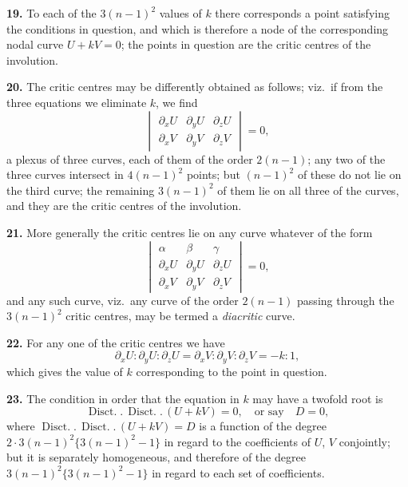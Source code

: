 \documentclass[11pt,a4paper]{article}
\providecommand{\Disct}{\operatorname{Disct.}}
\begin{document}
\medskip

\textbf{19.} To each of the $3(n-1)^2$ values of $k$ there corresponds a point satisfying the conditions in question, and which is therefore a node of the corresponding nodal curve $U + kV = 0$; the points in question are the critic centres of the involution.

\medskip

\textbf{20.} The critic centres may be differently obtained as follows; viz.\ if from the three equations we eliminate $k$, we find
\[
\begin{vmatrix} \partial_x U & \partial_y U & \partial_z U \\ \partial_x V & \partial_y V & \partial_z V \end{vmatrix} = 0,
\]
a plexus of three curves, each of them of the order $2(n - 1)$; any two of the three curves intersect in $4(n-1)^2$ points; but $(n-1)^2$ of these do not lie on the third curve; the remaining $3(n-1)^2$ of them lie on all three of the curves, and they are the critic centres of the involution.

\medskip

\textbf{21.} More generally the critic centres lie on any curve whatever of the form
\[
\begin{vmatrix} \alpha & \beta & \gamma \\ \partial_x U & \partial_y U & \partial_z U \\ \partial_x V & \partial_y V & \partial_z V \end{vmatrix} = 0,
\]
and any such curve, viz.\ any curve of the order $2(n-1)$ passing through the $3(n-1)^2$ critic centres, may be termed a \emph{diacritic} curve.

\medskip

\textbf{22.} For any one of the critic centres we have
\[
\partial_x U : \partial_y U : \partial_z U = \partial_x V : \partial_y V : \partial_z V = -k : 1,
\]
which gives the value of $k$ corresponding to the point in question.

\medskip

\textbf{23.} The condition in order that the equation in $k$ may have a twofold root is
\[
\Disct.\,\Disct.\,(U + kV) = 0,\quad\text{or say}\quad D = 0,
\]
where $\Disct.\,\Disct.\,(U + kV) = D$ is a function of the degree $2\cdot 3(n-1)^2\{3(n-1)^2 - 1\}$ in regard to the coefficients of $U$, $V$ conjointly; but it is separately homogeneous, and therefore of the degree $3(n-1)^2\{3(n-1)^2 - 1\}$ in regard to each set of coefficients.
\end{document}
